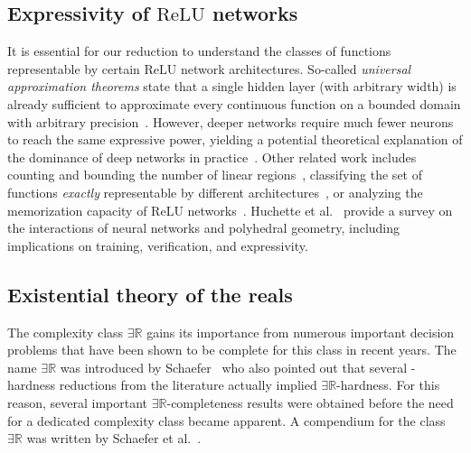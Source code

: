 \documentclass[11pt]{article}
\numberwithin{equation}{section}
\theoremstyle{definition}
\theoremstyle{plain}
\newcommand{\R}{\mathbb R}
\newcommand{\ER}{\texorpdfstring{\ensuremath{\exists\R}}{ER}\xspace}
\newcommand{\ReLU}{\ensuremath{\mathrm{ReLU}}\xspace}
\theoremstyle{plain}
\begin{document}
\subsection{Expressivity of \texorpdfstring{$\bm{{\ReLU}}$}{ReLU} networks}
It is essential for our reduction to understand the classes of functions representable by certain \ReLU network architectures.
So-called \emph{universal approximation theorems} state that a single hidden layer (with arbitrary width) is already sufficient to approximate every continuous function on a bounded domain with arbitrary precision~\cite{Cybenko1989_Approximation, Hornik1991_Approximation}.
However, deeper networks require much fewer neurons to reach the same expressive power, yielding a potential theoretical explanation of the dominance of deep networks in practice~\cite{Arora2018_Understanding, Eldan2016_Power, Hanin2019_Universal, Hanin2018_Approximating, Liang2017_Deep, Nguyen2018_Neural, Raghu2017_Expressive, Safran2017_Depth, Telgarsky2016_Benefits, Yarotsky2017_Error}. %
Other related work includes counting and bounding the number of linear regions~\cite{Hanin2019_Complexity, Montufar2022_Sharp, Montufar2014_Regions, Pascanu2014_Number, Raghu2017_Expressive, Serra2018_Bounding,stargalla2025computational}, classifying the set of functions \emph{exactly} representable by different architectures~\cite{Arora2018_Understanding, Dereich2022_Minimal, Haase2023_LowerBound, Hertrich2021_Towards, Hertrich2021_ReLU, Mukherjee2017_Lower, Zhang2018_Tropical,bakaev2025better}, or analyzing the memorization capacity of \ReLU networks~\cite{Vardi2022_Optimal, Yun2019_Small, Zhang2021_Understanding}.
Huchette et al.~\cite{Huchette2023_Survey} provide a survey on the interactions of neural networks and polyhedral geometry, including implications on training, verification, and expressivity.



\subsection{Existential theory of the reals}
The complexity class \ER gains its importance from numerous important 
%
decision  %
problems that have been shown to be complete for this class in recent years.
The name \ER was introduced by Schaefer~\cite{Schaefer2010_GeometryTopology} who also pointed out that several \NP-hardness reductions from the literature actually implied \ER-hardness.
For this reason, several important \ER-completeness results were obtained before the need for a dedicated complexity class became apparent. A compendium for the class \ER was written by Schaefer et al.~\cite{schaefer2024existential}.
\end{document}
